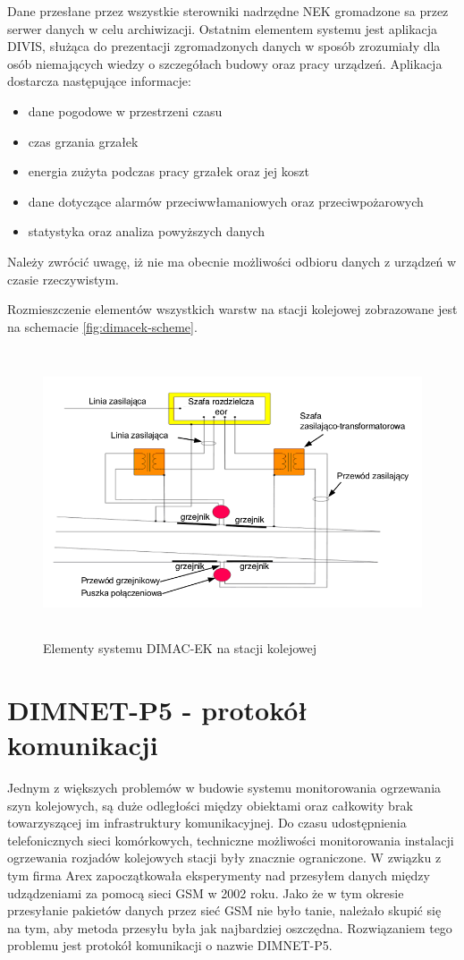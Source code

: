 Dane przesłane przez wszystkie sterowniki nadrzędne NEK gromadzone sa przez serwer danych w celu archiwizacji. Ostatnim elementem systemu jest aplikacja DIVIS, służąca do prezentacji zgromadzonych danych w sposób zrozumiały dla osób niemających wiedzy o szczegółach budowy oraz pracy urządzeń. Aplikacja dostarcza następujące informacje:


\begin{itemize}
\item dane pogodowe w przestrzeni czasu
\item czas grzania grzałek
\item energia zużyta podczas pracy grzałek oraz jej koszt
\item dane dotyczące alarmów przeciwwłamaniowych oraz przeciwpożarowych
\item statystyka oraz analiza powyższych danych
\end{itemize}

Należy zwrócić uwagę, iż nie ma obecnie możliwości odbioru danych z urządzeń w czasie rzeczywistym.

Rozmieszczenie elementów wszystkich warstw na stacji kolejowej zobrazowane jest na schemacie \ref{fig:dimacek-scheme}.

\begin{figure}[t]
	\includegraphics[height=85mm]{./img/dimacek_tory.png}
	\caption{Elementy systemu DIMAC-EK na stacji kolejowej}
	\label{fig:dimacek_tory}
\end{figure}

\section{DIMNET-P5 - protokół komunikacji}
Jednym z większych problemów w budowie systemu monitorowania ogrzewania szyn kolejowych, są duże odległości między obiektami oraz całkowity brak towarzyszącej im infrastruktury komunikacyjnej. Do czasu udostępnienia telefonicznych sieci komórkowych, techniczne możliwości monitorowania instalacji ogrzewania rozjadów kolejowych stacji były znacznie ograniczone. W związku z tym firma Arex zapoczątkowała eksperymenty nad przesyłem danych między udządzeniami za pomocą sieci GSM w 2002 roku. Jako że w tym okresie przesyłanie pakietów danych przez sieć GSM nie było tanie, należało skupić się na tym, aby metoda przesyłu była jak najbardziej oszczędna. Rozwiązaniem tego problemu jest protokół komunikacji o nazwie DIMNET-P5.

